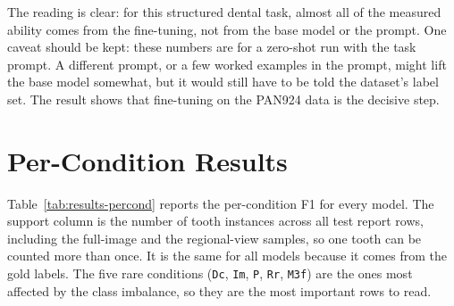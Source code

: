 \documentclass[a4paper,12pt]{report}
\begin{document}
The reading is clear: for this structured dental task, almost all of the measured ability comes from the fine-tuning, not from the base model or the prompt. One caveat should be kept: these numbers are for a zero-shot run with the task prompt. A different prompt, or a few worked examples in the prompt, might lift the base model somewhat, but it would still have to be told the dataset's label set. The result shows that fine-tuning on the PAN924 data is the decisive step.

\section{Per-Condition Results}

Table~\ref{tab:results-percond} reports the per-condition F1 for every model. The support column is the number of tooth instances across all test report rows, including the full-image and the regional-view samples, so one tooth can be counted more than once. It is the same for all models because it comes from the gold labels. The five rare conditions (\texttt{Dc}, \texttt{Im}, \texttt{P}, \texttt{Rr}, \texttt{M3f}) are the ones most affected by the class imbalance, so they are the most important rows to read.
\end{document}
